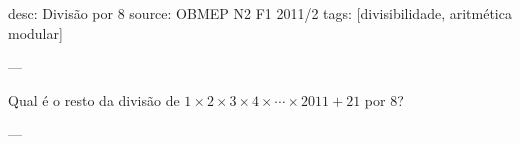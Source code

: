 desc:  Divisão por $8$
source:  OBMEP N2 F1 2011/2
tags:  [divisibilidade, aritmética modular]

---

Qual é o resto da divisão de $1 \times 2 \times 3 \times 4 \times \cdots \times 2011 + 21$ por $8$?

---
